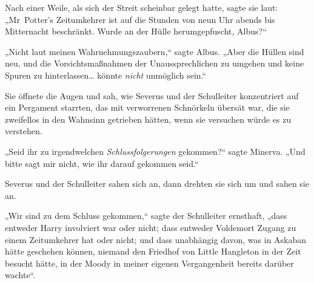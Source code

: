 Nach einer Weile, als sich der Streit scheinbar gelegt hatte, sagte sie laut: „Mr~Potter’s Zeitumkehrer ist auf die Stunden von neun Uhr abends bis Mitternacht beschränkt. Wurde an der Hülle herumgepfuscht, Albus?“

„Nicht laut meinen Wahrnehmungszaubern,“ sagte Albus. „Aber die Hüllen sind neu, und die Vorsichtsmaßnahmen der Unaussprechlichen zu umgehen und keine Spuren zu hinterlassen… könnte \emph{nicht} unmöglich sein.“

Sie öffnete die Augen und sah, wie Severus und der Schulleiter konzentriert auf ein Pergament starrten, das mit verworrenen Schnörkeln übersät war, die sie zweifellos in den Wahnsinn getrieben hätten, wenn sie versuchen würde es zu verstehen.

„Seid ihr zu irgendwelchen \emph{Schlussfolgerungen} gekommen?“ sagte Minerva. „Und bitte sagt mir nicht, wie ihr darauf gekommen seid.“

Severus und der Schulleiter sahen sich an, dann drehten sie sich um und sahen sie an.

„Wir sind zu dem Schluss gekommen,“ sagte der Schulleiter ernsthaft, „dass entweder Harry involviert war oder nicht; dass entweder Voldemort Zugang zu einem Zeitumkehrer hat oder nicht; und dass unabhängig davon, was in Askaban hätte geschehen können, niemand den Friedhof von Little Hangleton in der Zeit besucht hätte, in der Moody in meiner eigenen Vergangenheit bereits darüber wachte“.

